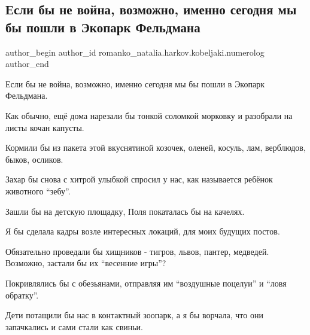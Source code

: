  
 
 
 
 
 
\subsection{Если бы не война, возможно, именно сегодня мы бы пошли в Экопарк Фельдмана}
\label{sec:10_04_2022.fb.romanko_natalia.harkov.kobeljaki.numerolog.1.ekopark_feldmana}
 
\ifcmt
 author_begin
   author_id romanko_natalia.harkov.kobeljaki.numerolog
 author_end
\fi

Если бы не война, возможно, именно сегодня мы бы пошли в Экопарк Фельдмана. 

Как обычно, ещё дома нарезали бы тонкой соломкой морковку и разобрали на листы
кочан капусты. 

Кормили бы из пакета этой вкуснятиной козочек, оленей, косуль, лам, верблюдов,
быков, осликов.


Захар бы снова с хитрой улыбкой спросил у нас, как называется ребёнок животного
\enquote{зебу}.

Зашли бы на детскую площадку, Поля покаталась бы на качелях. 

Я бы сделала кадры возле интересных локаций, для моих будущих постов. 

Обязательно проведали бы хищников - тигров, львов, пантер, медведей. Возможно,
застали бы их \enquote{весенние игры}?  


Покривлялись бы с обезьянами, отправляя им \enquote{воздушные поцелуи} и \enquote{ловя
обратку}. 

Дети потащили бы нас в контактный зоопарк, а я бы ворчала, что они запачкались
и сами стали как свиньи. 

